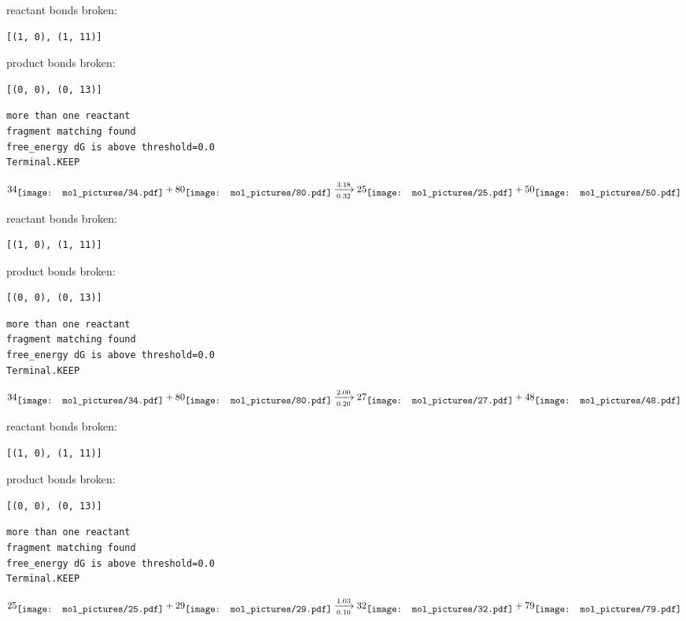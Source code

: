 \documentclass{article}
\begin{document}
reactant bonds broken:\begin{verbatim}
[(1, 0), (1, 11)]
\end{verbatim}
product bonds broken:\begin{verbatim}
[(0, 0), (0, 13)]
\end{verbatim}




\vspace{1cm}
\begin{verbatim}
more than one reactant
fragment matching found
free_energy dG is above threshold=0.0
Terminal.KEEP
\end{verbatim}
$$
34
\raisebox{-.5\height}{\texttt{[image: mol\_pictures/34.pdf]}}
+
80
\raisebox{-.5\height}{\texttt{[image: mol\_pictures/80.pdf]}}
\xrightarrow[0.32]{3.18}
25
\raisebox{-.5\height}{\texttt{[image: mol\_pictures/25.pdf]}}
+
50
\raisebox{-.5\height}{\texttt{[image: mol\_pictures/50.pdf]}}
$$


reactant bonds broken:\begin{verbatim}
[(1, 0), (1, 11)]
\end{verbatim}
product bonds broken:\begin{verbatim}
[(0, 0), (0, 13)]
\end{verbatim}




\vspace{1cm}
\begin{verbatim}
more than one reactant
fragment matching found
free_energy dG is above threshold=0.0
Terminal.KEEP
\end{verbatim}
$$
34
\raisebox{-.5\height}{\texttt{[image: mol\_pictures/34.pdf]}}
+
80
\raisebox{-.5\height}{\texttt{[image: mol\_pictures/80.pdf]}}
\xrightarrow[0.20]{2.00}
27
\raisebox{-.5\height}{\texttt{[image: mol\_pictures/27.pdf]}}
+
48
\raisebox{-.5\height}{\texttt{[image: mol\_pictures/48.pdf]}}
$$


reactant bonds broken:\begin{verbatim}
[(1, 0), (1, 11)]
\end{verbatim}
product bonds broken:\begin{verbatim}
[(0, 0), (0, 13)]
\end{verbatim}




\vspace{1cm}
\begin{verbatim}
more than one reactant
fragment matching found
free_energy dG is above threshold=0.0
Terminal.KEEP
\end{verbatim}
$$
25
\raisebox{-.5\height}{\texttt{[image: mol\_pictures/25.pdf]}}
+
29
\raisebox{-.5\height}{\texttt{[image: mol\_pictures/29.pdf]}}
\xrightarrow[0.10]{1.03}
32
\raisebox{-.5\height}{\texttt{[image: mol\_pictures/32.pdf]}}
+
79
\raisebox{-.5\height}{\texttt{[image: mol\_pictures/79.pdf]}}
$$
\end{document}
